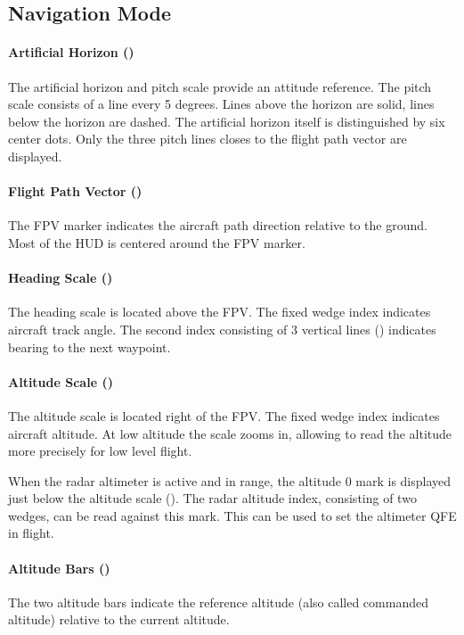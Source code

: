 \subsection{Navigation Mode}
\paragraph{Artificial Horizon ()}
The artificial horizon and pitch scale provide an attitude reference.
The pitch scale consists of a line every 5 degrees.
Lines above the horizon are solid, lines below the horizon are dashed.
The artificial horizon itself is distinguished by six center dots.
Only the three pitch lines closes to the flight path vector are displayed.

\paragraph{Flight Path Vector ()}
The FPV marker indicates the aircraft path direction relative to the ground.
Most of the HUD is centered around the FPV marker.

\paragraph{Heading Scale ()}
The heading scale is located above the FPV.
The fixed wedge index indicates aircraft track angle.
The second index consisting of 3 vertical lines
() indicates bearing to the next waypoint.

\paragraph{Altitude Scale ()}
The altitude scale is located right of the FPV.
The fixed wedge index indicates aircraft altitude.
At low altitude the scale zooms in,
allowing to read the altitude more precisely for low level flight.

When the radar altimeter is active and in range,
the altitude 0 mark is displayed just below the altitude scale
().
The radar altitude index, consisting of two wedges, can be read against this mark.
This can be used to set the altimeter QFE in flight.

\paragraph{Altitude Bars ()}
The two altitude bars indicate the reference altitude
(also called commanded altitude) relative to the current altitude.

